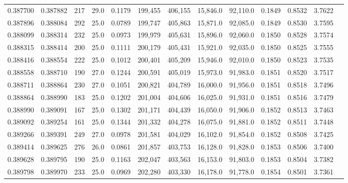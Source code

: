 \begin{tabular}{rrrrrrrrrrrrr}
0.387700 & 0.387882 &   217 & 29.0 &                                     0.1179 & 199,455 & 406,155 &  15,846.0 &  92,110.0 & 0.1849 & 0.8532 & 3.7622 \\
0.387896 & 0.388084 &   292 & 25.0 &                                     0.0789 & 199,747 & 405,863 &  15,871.0 &  92,085.0 & 0.1849 & 0.8530 & 3.7595 \\
0.388099 & 0.388314 &   232 & 25.0 &                                     0.0973 & 199,979 & 405,631 &  15,896.0 &  92,060.0 & 0.1850 & 0.8528 & 3.7574 \\
0.388315 & 0.388414 &   200 & 25.0 &                                     0.1111 & 200,179 & 405,431 &  15,921.0 &  92,035.0 & 0.1850 & 0.8525 & 3.7555 \\
0.388416 & 0.388554 &   222 & 25.0 &                                     0.1012 & 200,401 & 405,209 &  15,946.0 &  92,010.0 & 0.1850 & 0.8523 & 3.7535 \\
0.388558 & 0.388710 &   190 & 27.0 &                                     0.1244 & 200,591 & 405,019 &  15,973.0 &  91,983.0 & 0.1851 & 0.8520 & 3.7517 \\
0.388711 & 0.388864 &   230 & 27.0 &                                     0.1051 & 200,821 & 404,789 &  16,000.0 &  91,956.0 & 0.1851 & 0.8518 & 3.7496 \\
0.388864 & 0.388990 &   183 & 25.0 &                                     0.1202 & 201,004 & 404,606 &  16,025.0 &  91,931.0 & 0.1851 & 0.8516 & 3.7479 \\
0.388990 & 0.389091 &   167 & 25.0 &                                     0.1302 & 201,171 & 404,439 &  16,050.0 &  91,906.0 & 0.1852 & 0.8513 & 3.7463 \\
0.389092 & 0.389254 &   161 & 25.0 &                                     0.1344 & 201,332 & 404,278 &  16,075.0 &  91,881.0 & 0.1852 & 0.8511 & 3.7448 \\
0.389266 & 0.389391 &   249 & 27.0 &                                     0.0978 & 201,581 & 404,029 &  16,102.0 &  91,854.0 & 0.1852 & 0.8508 & 3.7425 \\
0.389414 & 0.389625 &   276 & 26.0 &                                     0.0861 & 201,857 & 403,753 &  16,128.0 &  91,828.0 & 0.1853 & 0.8506 & 3.7400 \\
0.389628 & 0.389795 &   190 & 25.0 &                                     0.1163 & 202,047 & 403,563 &  16,153.0 &  91,803.0 & 0.1853 & 0.8504 & 3.7382 \\
0.389798 & 0.389970 &   233 & 25.0 &                                     0.0969 & 202,280 & 403,330 &  16,178.0 &  91,778.0 & 0.1854 & 0.8501 & 3.7361 \\

\end{tabular}
